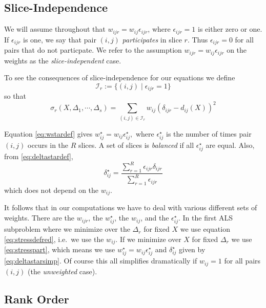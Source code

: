 \documentclass[
  12pt,
]{article}
\begin{document}
\subsection{Slice-Independence}\label{slice-independence}

We will assume throughout that \(w_{ijr}=w_{ij}\epsilon_{ijr}\), where
\(\epsilon_{ijr}=1\) is either zero or one. If \(\epsilon_{ijr}\) is one, we say that pair \((i,j)\) \emph{participates} in slice \(r\). Thus \(\epsilon_{ijr}=0\) for all pairs that do not particpate. We refer to the assumption \(w_{ijr}=w_{ij}\epsilon_{ijr}\) on the weights as the \emph{slice-independent} case.

To see the consequences of slice-independence for our equations
we define
\begin{equation}
\mathcal{I}_r:=\{(i, j)\mid \epsilon_{ijr}= 1\}
\label{eq:irdef}
\end{equation}
so that
\begin{equation}
\sigma_r(X,\Delta_1,\cdots,\Delta_s)=\sum_{(i,j)\in\mathcal{I}_r} w_{ij}(\delta_{ijr}-d_{ij}(X))^2
\label{eq:stressdefred}
\end{equation}

Equation \eqref{eq:wstardef} gives \(w_{ij}^\star=w_{ij}\epsilon_{ij}^\star,\)
where \(\epsilon_{ij}^\star\) is the number of times pair \((i,j)\) occurs in
the \(R\) slices. A set of slices is \emph{balanced} if all \(\epsilon_{ij}^\star\) are equal. Also, from \eqref{eq:deltastardef},
\begin{equation}
\delta_{ij}^\star=\frac{\sum_{r=1}^R \epsilon_{ijr}\delta_{ijr}}{\sum_{r=1}^R \epsilon_{ijr}}
\label{eq:deltastarsimp}
\end{equation}
which does not depend on the \(w_{ij}\).

It follows that in our computations we have to deal with various
different sets of weights. There are the \(w_{ijr}\), the \(w_{ij}^\star\),
the \(w_{ij}\), and the \(\epsilon_{ij}^\star\). In the first ALS subproblem
where we minimize over the \(\Delta_r\) for fixed \(X\) we use
equation \eqref{eq:stressdefred}, i.e.~we use the \(w_{ij}\). If we minimize over \(X\) for fixed \(\Delta_r\) we use \eqref{eq:stresspart}, which means we
use \(w_{ij}^\star=w_{ij}\epsilon_{ij}^\star\) and \(\delta_{ij}^\star\)
given by \eqref{eq:deltastarsimp}. Of course this all simplifies dramatically
if \(w_{ij}=1\) for all pairs \((i,j)\) (the \emph{unweighted} case).

\subsection{Rank Order}\label{rank-order}
\end{document}
